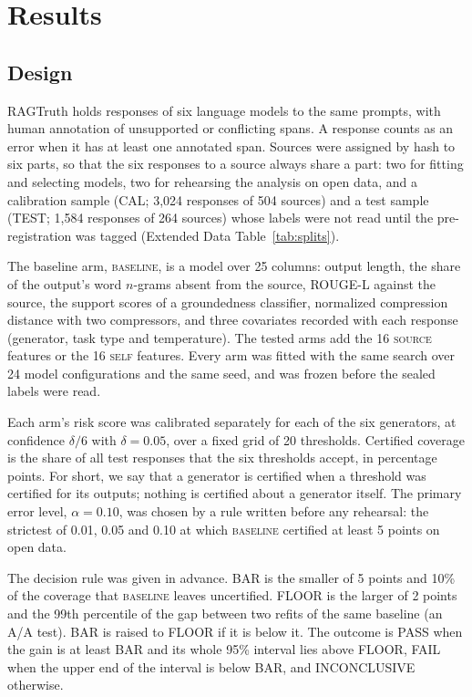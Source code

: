\documentclass[11pt]{article}
\newcommand{\arm}[1]{\textsc{#1}}
\begin{document}
\section*{Results}

\subsection*{Design}

RAGTruth\cite{ragtruth} holds responses of six language models to the same prompts, with human annotation of unsupported or conflicting spans. A response counts as an error when it has at least one annotated span. Sources were assigned by hash to six parts, so that the six responses to a source always share a part: two for fitting and selecting models, two for rehearsing the analysis on open data, and a calibration sample (CAL; 3,024 responses of 504 sources) and a test sample (TEST; 1,584 responses of 264 sources) whose labels were not read until the pre-registration was tagged (Extended Data Table~\ref{tab:splits}).

The baseline arm, \arm{baseline}, is a model over 25 columns: output length, the share of the output's word $n$-grams absent from the source, ROUGE-L against the source, the support scores of a groundedness classifier\cite{minicheck}, normalized compression distance\cite{ncd} with two compressors, and three covariates recorded with each response (generator, task type and temperature). The tested arms add the 16 \arm{source} features or the 16 \arm{self} features. Every arm was fitted with the same search over 24 model configurations and the same seed, and was frozen before the sealed labels were read.

Each arm's risk score was calibrated separately for each of the six generators, at confidence $\delta/6$ with $\delta = 0.05$, over a fixed grid of 20 thresholds. Certified coverage is the share of all test responses that the six thresholds accept, in percentage points. For short, we say that a generator is certified when a threshold was certified for its outputs; nothing is certified about a generator itself. The primary error level, $\alpha = 0.10$, was chosen by a rule written before any rehearsal: the strictest of 0.01, 0.05 and 0.10 at which \arm{baseline} certified at least 5 points on open data.

The decision rule was given in advance. BAR is the smaller of 5 points and 10\% of the coverage that \arm{baseline} leaves uncertified. FLOOR is the larger of 2 points and the 99th percentile of the gap between two refits of the same baseline (an A/A test). BAR is raised to FLOOR if it is below it. The outcome is PASS when the gain is at least BAR and its whole 95\% interval lies above FLOOR, FAIL when the upper end of the interval is below BAR, and INCONCLUSIVE otherwise.
\end{document}
